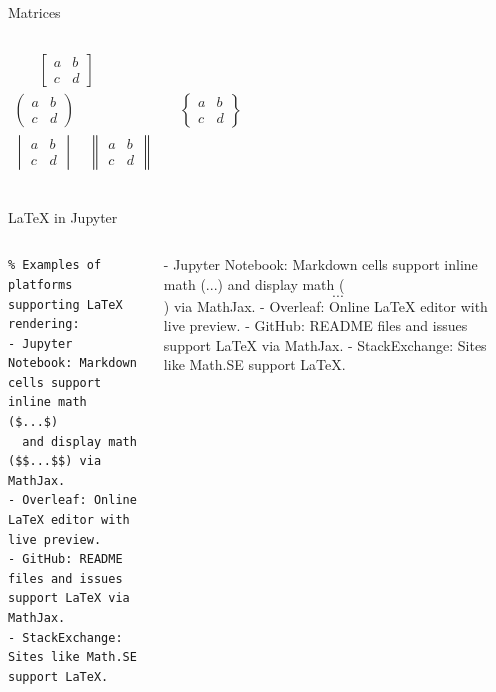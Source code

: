 \documentclass[aspectratio=1610]{beamer}
\begin{document}
\begin{frame}[fragile]{Matrices}
\begin{columns}[T]
\begin{align*}
\begin{matrix}
   \end{matrix} \quad 
 \begin{bmatrix} a & b \\ c & d 
   \end{bmatrix} & \\
 \begin{pmatrix} a & b \\ c & d 
   \end{pmatrix} & \quad
 \begin{Bmatrix} a & b \\ c & d 
   \end{Bmatrix} \\
 \begin{vmatrix} a & b \\ c & d 
   \end{vmatrix} \quad 
 \begin{Vmatrix} a & b \\ c & d 
   \end{Vmatrix} & \\
\end{align*}
  \end{columns}
\end{frame}


\begin{frame}[fragile]{LaTeX in Jupyter}
  \begin{columns}[T]
      \begin{lstlisting}
% Examples of platforms supporting LaTeX rendering:
- Jupyter Notebook: Markdown cells support inline math ($...$)
  and display math ($$...$$) via MathJax.
- Overleaf: Online LaTeX editor with live preview.
- GitHub: README files and issues support LaTeX via MathJax.
- StackExchange: Sites like Math.SE support LaTeX.
      \end{lstlisting}
- Jupyter Notebook: Markdown cells support inline math ($...$)
  and display math ($$...$$) via MathJax.
- Overleaf: Online LaTeX editor with live preview.
- GitHub: README files and issues support LaTeX via MathJax.
- StackExchange: Sites like Math.SE support LaTeX.
  \end{columns}
\end{frame}
\end{document}
